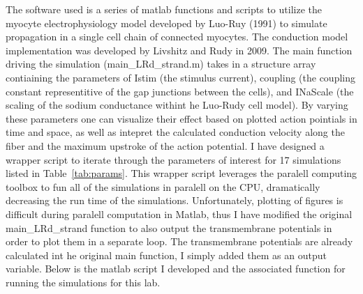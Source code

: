 \documentclass[12pt]{article}
\begin{document}
The software used is a series of matlab functions and scripts to utilize the myocyte electrophysiology model developed by Luo-Ruy (1991) to simulate propagation in a single cell chain of connected myocytes. The conduction model implementation was developed by Livshitz and Rudy in 2009.\cite{Livshitz2009} The main function driving the simulation (main\_LRd\_strand.m) takes in a structure array contiaining the parameters of Istim (the stimulus current), coupling (the coupling constant representitive of the gap junctions between the cells), and INaScale (the scaling of the sodium conductance withint he Luo-Rudy cell model). By varying these parameters one can visualize their effect based on plotted action pointials in time and space, as well as intepret the calculated conduction velocity along the fiber and the maximum upstroke of the action potential. I have designed a wrapper script to iterate through the parameters of interest for 17 simulations listed in Table~\ref{tab:params}. This wrapper script leverages the paralell computing toolbox to fun all of the simulations in paralell on the CPU, dramatically decreasing the run time of the simulations. Unfortunately, plotting of figures is difficult during paralell computation in Matlab, thus I have modified the original main\_LRd\_strand function to also output the transmembrane potentials in order to plot them in a separate loop. The transmembrane potentials are already calculated int he original main function, I simply added them as an output variable. Below is the matlab script I developed and the associated function for running the simulations for this lab.
\end{document}
